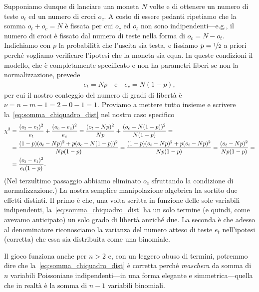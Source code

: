 Supponiamo dunque di lanciare una moneta $N$ volte e di ottenere un numero di
teste $o_t$ ed un numero di croci $o_c$. A costo di essere pedanti ripetiamo che
la somma $o_t + o_c = N$ è fissata per cui $o_c$ ed $o_t$ non sono
indipendenti---e.g., il numero di croci è fissato dal numero di teste nella
forma di $o_c = N - o_t$. Indichiamo con $p$ la probabilità che l'uscita sia
testa, e fissiamo $p = \nicefrac{1}{2}$ a priori perché vogliamo verificare
l'ipotesi che la moneta sia equa. In queste condizioni il modello, che è
completamente specificato e non ha parametri liberi se non la normalizzazione,
prevede
\begin{align*}
  e_t = N p \quad \text{e} \quad
  e_c = N(1 - p),
\end{align*}
per cui il nostro conteggio del numero di gradi di libertà è
$\nu = n - m - 1 = 2 - 0 - 1 = 1$. Proviamo a mettere tutto insieme e scrivere
la~\eqref{eq:somma_chiquadro_dist} nel nostro caso specifico
\begin{align*}
  \chi^2 & = \frac{(o_t - e_t)^2}{e_t} + \frac{(o_c - e_c)^2}{e_c} =
  \frac{(o_t - N p)^2}{N p} + \frac{(o_c - N(1 - p))^2}{N(1 - p)} = \\
  & = \frac{(1 - p)(o_t - N p)^2 + p(o_c - N(1 - p))^2}{N p(1 - p)} =
  \frac{(1 - p)(o_t - N p)^2 + p(o_t - N p)^2}{N p(1 - p)} =
  \frac{(o_t - N p)^2}{N p(1 - p)} =\\
  & = \frac{(o_t - e_t)^2}{e_t(1 - p)}.
\end{align*}
(Nel terzultimo passaggio abbiamo eliminato $o_c$ sfruttando la condizione di
normalizzazione.) La nostra semplice manipolazione algebrica ha sortito due
effetti distinti. Il primo è che, una volta scritta in funzione delle sole
variabili indipendenti, la~\eqref{eq:somma_chiquadro_dist} ha un solo termine
(e quindi, come avevamo anticipato) un solo grado di libertà anziché due.
La seconda è che adesso al denominatore riconosciamo la varianza del numero
atteso di teste $e_t$ nell'ipotesi (corretta) che essa sia distribuita come una
binomiale.

Il gioco funziona anche per $n > 2$ e, con un leggero abuso di
termini, potremmo dire che la~\eqref{eq:somma_chiquadro_dist} è corretta
perché \emph{maschera} da somma di $n$ variabili Poissoniane indipendenti---in
una forma elegante e simmetrica---quella che in realtà è la somma di
$n - 1$ variabili binomiali.

